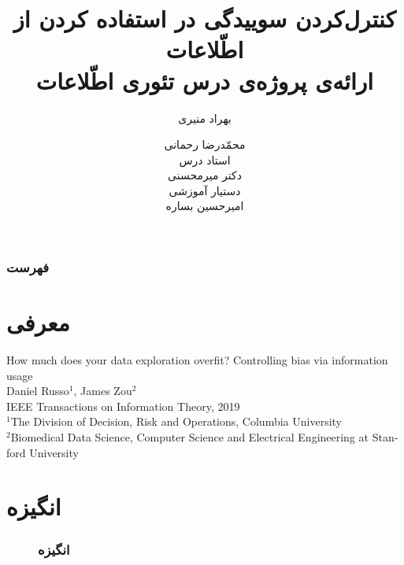 \documentclass[]{beamer}
\title[کنترل‌کردن سوییدگی در استفاده کردن از اطّلاعات]{
کنترل‌کردن سوییدگی در استفاده کردن از اطّلاعات\\
\small{
ارائه‌ی پروژه‌ی درس تئوری اطّلاعات}}
\author[بهراد منیری
و محمّدرضا رحمانی
]{
	بهراد منیری
\and
	محمّدرضا رحمانی\\
		\vspace{0.5cm}
	\scriptsize استاد درس\\
	\small
	دکتر  میرمحسنی\\
	\vspace{0.5cm}
	\scriptsize
	 دستیار آموزشی\\ 
	 \small
	 امیرحسین بساره
}
\institute[دانشگاه‌ صنعتی شریف]{
دانشکده‌ی مهندسی برق\\
دانشگاه صنعتی شریف
}
\date{}
\begin{document}
\begin{persian}
\begin{frame}
\maketitle
\end{frame}

\everypar{\rightskip\rightmargin}

\begin{frame}
\frametitle{فهرست}
\tableofcontents
\end{frame}

\section{معرفی}

\begin{frame}
\begin{center}
	\begin{latin}
	\Large{How much does your data exploration overfit? Controlling bias via information usage}\\
	\vspace{0.6cm}
	\large{Daniel Russo$^1$, James Zou$^2$}\\
	\vspace{0.3cm}
	\normalsize{IEEE Transactions on Information Theory, 2019}\\	
	\vspace{1cm}
	\small{
	$^1$The  Division  of  Decision,  Risk  and  Operations, Columbia University\\
	$^2$Biomedical Data Science, Computer Science and Electrical Engineering at Stanford University
}

	\end{latin}
\end{center}
\end{frame}


\section{انگیزه}
\begin{frame}
\begin{figure}[h!]
	\frametitle{انگیزه}
	\centering
	\begin{tikzpicture}[auto, node distance=0.5cm, every loop/.style={},
	thick,state/.style={font=\sffamily\Large}, scale = 0.93]
	

\end{tikzpicture}
\end{figure}
\end{frame}
\end{persian}
\end{document}
